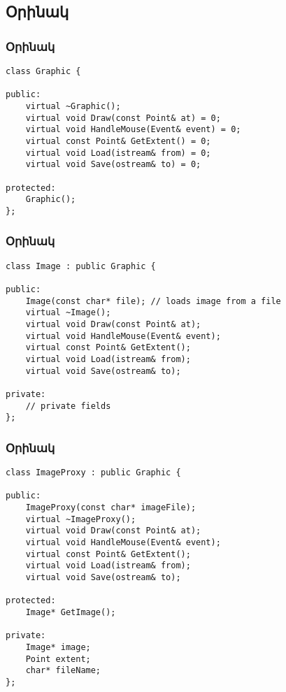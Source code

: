 \documentclass{beamer}
\begin{document}
\subsection{Օրինակ}
\begin{frame}[fragile]\frametitle{Օրինակ}
\begin{english}
\begin{verbatim}
class Graphic {

public:
    virtual ~Graphic();
    virtual void Draw(const Point& at) = 0;
    virtual void HandleMouse(Event& event) = 0;
    virtual const Point& GetExtent() = 0;
    virtual void Load(istream& from) = 0;
    virtual void Save(ostream& to) = 0;

protected:
    Graphic();
};
\end{verbatim}
\end{english}
\end{frame}

\begin{frame}[fragile]\frametitle{Օրինակ}
\begin{english}
\begin{verbatim}
class Image : public Graphic {

public:
    Image(const char* file); // loads image from a file
    virtual ~Image();
    virtual void Draw(const Point& at);
    virtual void HandleMouse(Event& event);
    virtual const Point& GetExtent();
    virtual void Load(istream& from);
    virtual void Save(ostream& to);

private:
    // private fields
};
\end{verbatim}
\end{english}
\end{frame}

\begin{frame}[fragile]\frametitle{Օրինակ}
\begin{english}
\begin{verbatim}
class ImageProxy : public Graphic {

public:
    ImageProxy(const char* imageFile);
    virtual ~ImageProxy();
    virtual void Draw(const Point& at);
    virtual void HandleMouse(Event& event);
    virtual const Point& GetExtent();
    virtual void Load(istream& from);
    virtual void Save(ostream& to);

protected:
    Image* GetImage();

private:
    Image* image;
    Point extent;
    char* fileName;
};
\end{verbatim}
\end{english}
\end{frame}
\end{document}
